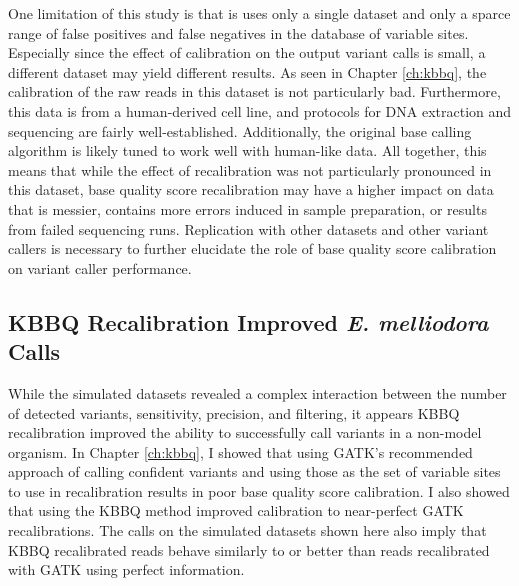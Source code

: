 \documentclass{report}
\begin{document}
\begin{outline}
\item One limitation of this study is that is uses only a single dataset and only a sparce range of false positives and false negatives in the database of variable sites. Especially since the effect of calibration on the output variant calls is small, a different dataset may yield different results. As seen in Chapter \ref{ch:kbbq}, the calibration of the raw reads in this dataset is not particularly bad. Furthermore, this data is from a human-derived cell line, and protocols for DNA extraction and sequencing are fairly well-established. Additionally, the original base calling algorithm is likely tuned to work well with human-like data. All together, this means that while the effect of recalibration was not particularly pronounced in this dataset, base quality score recalibration may have a higher impact on data that is messier, contains more errors induced in sample preparation, or results from failed sequencing runs. Replication with other datasets and other variant callers is necessary to further elucidate the role of base quality score calibration on variant caller performance.  



\subsection{KBBQ Recalibration Improved \textit{E. melliodora} Calls}

\item While the simulated datasets revealed a complex interaction between the number of detected variants, sensitivity, precision, and filtering, it appears KBBQ recalibration improved the ability to successfully call variants in a non-model organism. In Chapter \ref{ch:kbbq}, I showed that using GATK's recommended approach of calling confident variants and using those as the set of variable sites to use in recalibration results in poor base quality score calibration. I also showed that using the KBBQ method improved calibration to near-perfect GATK recalibrations. The calls on the simulated datasets shown here also imply that KBBQ recalibrated reads behave similarly to or better than reads recalibrated with GATK using perfect information.


\end{outline}
\end{document}
